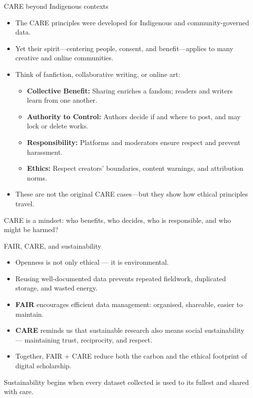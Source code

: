 \documentclass[aspectratio=169]{beamer}
\begin{document}
\begin{frame}{CARE beyond Indigenous contexts}
\begin{itemize}
  \item The CARE principles were developed for Indigenous and community-governed data.  
  \item Yet their spirit—centering people, consent, and benefit—applies to many creative and online communities.
  \item Think of fanfiction, collaborative writing, or online art:
    \begin{itemize}
      \item \textbf{Collective Benefit:} Sharing enriches a fandom; readers and writers learn from one another.  
      \item \textbf{Authority to Control:} Authors decide if and where to post, and may lock or delete works.  
      \item \textbf{Responsibility:} Platforms and moderators ensure respect and prevent harassment.  
      \item \textbf{Ethics:} Respect creators’ boundaries, content warnings, and attribution norms.
    \end{itemize}
  \item These are not the original CARE cases—but they show how ethical principles travel.
\end{itemize}
\medskip
CARE is a mindset: who benefits, who decides, who is responsible, and who might be harmed?
\end{frame}

\begin{frame}{FAIR, CARE, and sustainability}
\begin{itemize}
  \item Openness is not only ethical — it is environmental.  
  \item Reusing well-documented data prevents repeated fieldwork, duplicated storage, and wasted energy.  
  \item \textbf{FAIR} encourages efficient data management: organised, shareable, easier to maintain.  
  \item \textbf{CARE} reminds us that sustainable research also means social sustainability — maintaining trust, reciprocity, and respect.  
  \item Together, FAIR + CARE reduce both the carbon and the ethical footprint of digital scholarship.
\end{itemize}
\medskip
Sustainability begins when every dataset collected is used to its fullest and shared with care.
\end{frame}
\end{document}
